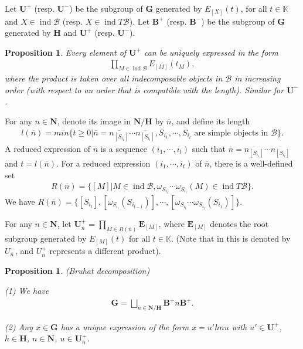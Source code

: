 \documentclass[12pt]{amsart}
\newtheorem{proposition}[theorem]{Proposition}
\begin{document}
Let $\mathbf{U}^+$ (resp. $\mathbf{U}^-$) be the subgroup of $\mathbf{G}$ generated by $E_{[X]}(t)$, for all $t\in \mathbb{K}$ and $X\in \operatorname{ind}\mathcal{B}$ (resp. $X\in \operatorname{ind}T\mathcal{B}$).
Let $\mathbf{B}^+$ (resp. $\mathbf{B}^-$) be the subgroup of $\mathbf{G}$ generated by $\mathbf{H}$ and $\mathbf{U}^+$ (resp. $\mathbf{U}^-$).

\begin{proposition}
    Every element of $\mathbf{U}^+$ can be uniquely expressed in the form 
    \begin{align*}
        \prod\limits_{M\in \operatorname{ind}\mathcal{B}} E_{[M]}(t_M),
    \end{align*}
    where the product is taken over all indecomposable objects in $\mathcal{B}$ in increasing order (with respect to an order that is compatible with the length).
    Similar for $\mathbf{U}^-$.
\end{proposition}

For any $n\in \mathbf{N}$, denote its image in $\mathbf{N}/\mathbf{H}$ by $\overline{n}$, and define its length
\begin{align*}
    l(\overline{n}) = min\{ t \geq 0 | \overline{n} = \overline{n_{[S_{i_1}]}} \cdots \overline{n_{[S_{i_t}]}}, S_{i_1},\cdots,S_{i_t} \text{ are simple objects in } \mathcal{B} \}.
\end{align*}
A reduced expression of $\overline{n}$ is a sequence $(i_1,\cdots,i_t)$ such that $\overline{n} = \overline{n_{[S_{i_1}]}} \cdots \overline{n_{[S_{i_t}]}}$ and $t=l(\overline{n})$.
For a reduced expression $(i_1,\cdots,i_t)$ of $\overline{n}$, there is a well-defined set
\begin{align*}
    R(\overline{n}) = \{  [M] | M\in \operatorname{ind}\mathcal{B}, \omega_{S_{i_1}}\cdots \omega_{S_{i_t}}(M) \in \operatorname{ind}T\mathcal{B}    \}.
\end{align*}
We have $R(\overline{n}) = \{ [S_{i_t}], [\omega_{S_{i_t}}(S_{i_{t-1}})], \cdots,[\omega_{S_{i_t}} \cdots \omega_{S_{i_2}}(S_{i_1})]   \}$.

For any $n\in \mathbf{N}$, let $ \mathbf{U}^+_{\overline{n}} = \prod\limits_{M\in  R(\overline{n})} \mathbf{E}_{[M]}$, where $\mathbf{E}_{[M]}$ denotes the root subgroup generated by $E_{[M]}(t)$ for all $t\in \mathbb{K}$. (Note that in \cite{notes1} this is denoted by $U_{\overline{n}}^-$, and $U_{\overline{n}}^+$ represents a different product).

\begin{proposition}
    (Bruhat decomposition)

    (1) We have
     \begin{align*}
         \mathbf{G} = \bigsqcup\limits_{\overline{n}\in \mathbf{N}/\mathbf{H}} \mathbf{B}^+ n\mathbf{B}^+ .
    \end{align*}

    (2) Any $x\in \mathbf{G}$ has a unique expression of the form $x=u'hnu$ with $u'\in \mathbf{U}^+$, $h\in \mathbf{H}$, $n\in \mathbf{N}$, $u\in \mathbf{U}^+_{\overline{n}}$.
\end{proposition}
\end{document}
